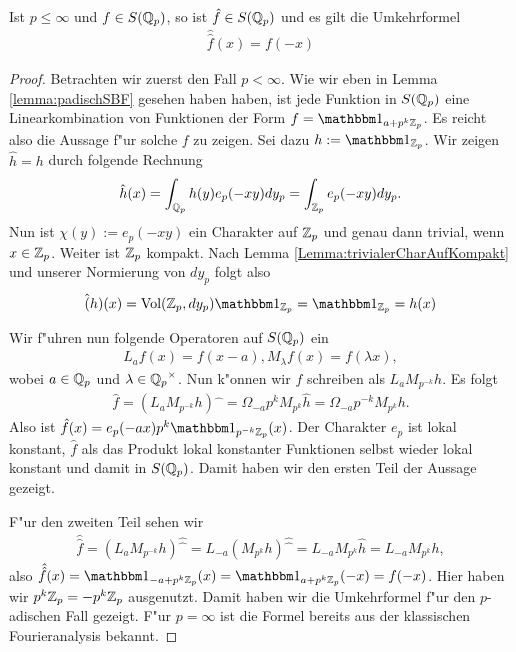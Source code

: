 		\begin{satz}\label{Satz:fourierumkehrformel}
			Ist $p\leq\infty$ und $f\in S({\mathbb{Q}_p})$, so ist $\hat{f} \in S({\mathbb{Q}_p})$ und es gilt die Umkehrformel
			\begin{align*}
				\hat{\hat{f}}(x) = f(-x)
			\end{align*}
		\end{satz}
		\begin{proof}
			Betrachten wir zuerst den Fall $p<\infty$. Wie wir eben in Lemma \ref{lemma:padischSBF} gesehen haben haben, ist jede Funktion in $S({\mathbb{Q}_p})$ eine Linearkombination von Funktionen der Form $f = \ind_{a+p^k\Zp}$. Es reicht also die Aussage f"ur solche $f$ zu zeigen.
			Sei dazu $h:= \ind_{\Zp}$. Wir zeigen $\hat{h} = h$ durch folgende Rechnung
			\begin{align*}
				\hat{h}(x) = \int_{\mathbb{Q}_p} h(y) e_p (-xy) dy_p = \int_{\mathbb{Z}_p} e_p(-xy) dy_p.
			\end{align*}
			Nun ist $\chi(y):=e_p(-xy)$ ein Charakter auf ${\mathbb{Z}_p}$ und genau dann trivial, wenn $x\in{\mathbb{Z}_p}$. 
			Weiter ist ${\mathbb{Z}_p}$ kompakt. 
			Nach Lemma \ref{Lemma:trivialerCharAufKompakt} und unserer Normierung von $dy_p$ folgt also
			\begin{align*}
				\hat(h)(x) = \text{Vol}(\Zp, dy_p) \ind_\Zp = \ind_\Zp = h(x)
			\end{align*}
			
			Wir f"uhren nun folgende Operatoren auf $S({\mathbb{Q}_p})$ ein
			\begin{align*}
				L_a f(x) = f(x-a), M_\lambda f(x) = f(\lambda x),
			\end{align*}
			wobei $a \in {\mathbb{Q}_p}$ und $\lambda \in {\mathbb{Q}_p}^\times$. 
			Nun k"onnen wir $f$ schreiben als $L_a M_{p^{-k}}h$. 
			Es folgt
			\begin{align*}
				\hat{f} = (L_a M_{p^{-k}}h)\widehat{\phantom{x}} = \Omega_{-a}p^{k}M_{p^k}\hat{h}=\Omega_{-a}p^{-k}M_{p^k}h.
			\end{align*}
			Also ist $\hat{f} (x) = e_p(-ax)p^k\ind_{p^{-k}\Zp}(x)$. 
			Der Charakter $e_p$ ist lokal konstant, $\hat{f}$ als das Produkt lokal konstanter Funktionen selbst wieder lokal konstant und damit in $S({\mathbb{Q}_p})$. 
			Damit haben wir den ersten Teil der Aussage gezeigt.
			
			F"ur den zweiten Teil sehen wir
			\begin{align*}
				\hat{\hat{f}} = (L_a M_{p^{-k}}h)\widehat{\widehat{\phantom{x}}} = L_{-a} (M_{p^k}h)\widehat{\widehat{\phantom{x}}}=L_{-a}M_{p^k}\hat{h} =L_{-a}M_{p^k}h,
			\end{align*}
			also $\hat{\hat{f}} (x) = \ind_{-a+p^k\Zp} (x) = \ind_{a+p^k\Zp} (-x) = f(-x)$. 
			Hier haben wir $p^k{\mathbb{Z}_p} = - p^k{\mathbb{Z}_p}$ ausgenutzt. 
			Damit haben wir die Umkehrformel f"ur den $p$-adischen Fall gezeigt. 
			F"ur $p=\infty$ ist die Formel bereits aus der klassischen Fourieranalysis bekannt.
		\end{proof}
		
